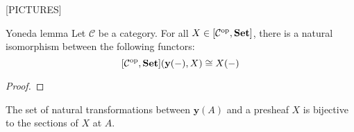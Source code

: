[PICTURES]

\begin{theorem}{Yoneda lemma}
    Let $\mathcal{C}$ be a category. For all $X \in [\mathcal{C}^{\text{op}}, {\normalfont\textbf{Set}}]$, there is a natural isomorphism between the following functors:
        $$[\mathcal{C}^{\text{op}}, {\normalfont\textbf{Set}}](\mathbf{y}(-), X) \cong X(-)$$
\end{theorem}

\begin{proof}
    
    
\end{proof}

\begin{remark}
    The set of natural transformations between $\mathbf{y}(A)$ and a presheaf $X$ is bijective to the sections of $X$ at $A$.
\end{remark}


















